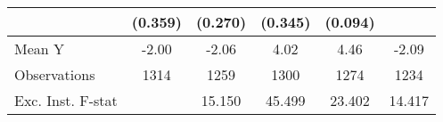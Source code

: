 {\begin{tabular}{l*{5}{c}}
            &     (0.359)         &     (0.270)         &     (0.345)         &     (0.094)         &                     \\
\midrule
Mean Y      &       -2.00         &       -2.06         &        4.02         &        4.46         &       -2.09         \\
Observations&        1314         &        1259         &        1300         &        1274         &        1234         \\
Exc. Inst. F-stat&                     &      15.150         &      45.499         &      23.402         &      14.417         \\
\bottomrule
\end{tabular}
}
